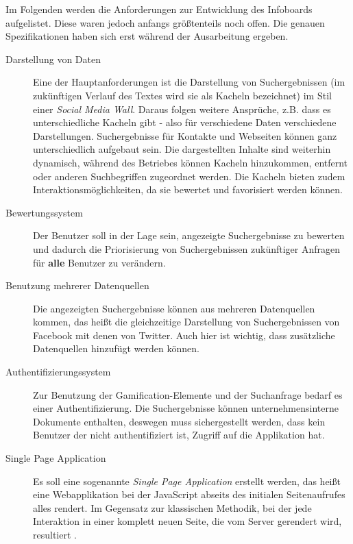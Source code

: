 \documentclass[12pt,twoside]{book}
\begin{document}
Im Folgenden werden die Anforderungen zur Entwicklung des Infoboards aufgelistet. Diese waren jedoch anfangs größtenteils noch offen. Die genauen Spezifikationen haben sich erst während der Ausarbeitung ergeben.

\begin{description}

\item[Darstellung von Daten]

Eine der Hauptanforderungen ist die Darstellung von Suchergebnissen (im zukünftigen Verlauf des Textes wird sie als Kacheln bezeichnet) im Stil einer \textit{Social Media Wall}. Daraus folgen weitere Ansprüche, z.B. dass es unterschiedliche Kacheln gibt - also für verschiedene Daten verschiedene Darstellungen. Suchergebnisse für Kontakte und Webseiten können ganz unterschiedlich aufgebaut sein. Die dargestellten Inhalte sind weiterhin dynamisch, während des Betriebes können Kacheln hinzukommen, entfernt oder anderen Suchbegriffen zugeordnet werden. Die Kacheln bieten zudem Interaktionsmöglichkeiten, da sie bewertet und favorisiert werden können.

\item[Bewertungssystem]

  Der Benutzer soll in der Lage sein, angezeigte Suchergebnisse zu bewerten und dadurch die Priorisierung von Suchergebnissen zukünftiger Anfragen für \textbf{alle} Benutzer zu verändern.

\item[Benutzung mehrerer Datenquellen]
  Die angezeigten Suchergebnisse können aus mehreren Datenquellen kommen, das heißt die gleichzeitige Darstellung von Suchergebnissen von Facebook mit denen von Twitter. Auch hier ist wichtig, dass zusätzliche Datenquellen hinzufügt werden können.

\item[Authentifizierungssystem]
	Zur Benutzung der Gamification-Elemente und der Suchanfrage bedarf es einer Authentifizierung. Die Suchergebnisse können unternehmensinterne Dokumente enthalten, deswegen muss sichergestellt werden, dass kein Benutzer der nicht authentifiziert ist, Zugriff auf die Applikation hat.

\item[Single Page Application]
  Es soll eine sogenannte \textit{Single Page Application} erstellt werden, das heißt eine Webapplikation bei der JavaScript abseits des initialen Seitenaufrufes alles rendert. Im Gegensatz zur klassischen Methodik, bei der jede Interaktion in einer komplett neuen Seite, die vom Server gerendert wird, resultiert \cite{mesbah2007migrating}.


\end{description}
\end{document}
